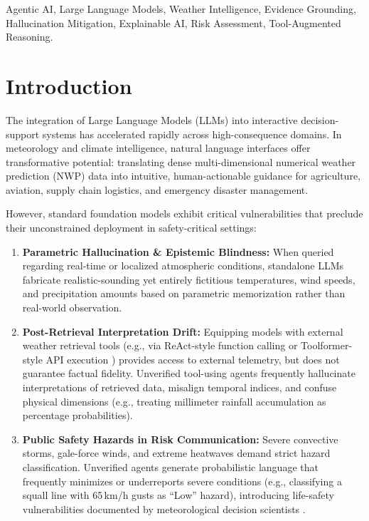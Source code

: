 \documentclass[conference]{IEEEtran}
\begin{document}
\begin{IEEEkeywords}
Agentic AI, Large Language Models, Weather Intelligence, Evidence Grounding, Hallucination Mitigation, Explainable AI, Risk Assessment, Tool-Augmented Reasoning.
\end{IEEEkeywords}

\section{Introduction}

The integration of Large Language Models (LLMs) into interactive decision-support systems has accelerated rapidly across high-consequence domains. In meteorology and climate intelligence, natural language interfaces offer transformative potential: translating dense multi-dimensional numerical weather prediction (NWP) data into intuitive, human-actionable guidance for agriculture, aviation, supply chain logistics, and emergency disaster management.

However, standard foundation models exhibit critical vulnerabilities that preclude their unconstrained deployment in safety-critical settings:
\begin{enumerate}
    \item \textbf{Parametric Hallucination \& Epistemic Blindness:} When queried regarding real-time or localized atmospheric conditions, standalone LLMs fabricate realistic-sounding yet entirely fictitious temperatures, wind speeds, and precipitation amounts based on parametric memorization rather than real-world observation.
    \item \textbf{Post-Retrieval Interpretation Drift:} Equipping models with external weather retrieval tools (e.g., via ReAct-style function calling \cite{yao2023react} or Toolformer-style API execution \cite{schick2023toolformer}) provides access to external telemetry, but does not guarantee factual fidelity. Unverified tool-using agents frequently hallucinate interpretations of retrieved data, misalign temporal indices, and confuse physical dimensions (e.g., treating millimeter rainfall accumulation as percentage probabilities).
    \item \textbf{Public Safety Hazards in Risk Communication:} Severe convective storms, gale-force winds, and extreme heatwaves demand strict hazard classification. Unverified agents generate probabilistic language that frequently minimizes or underreports severe conditions (e.g., classifying a squall line with 65\,km/h gusts as ``Low'' hazard), introducing life-safety vulnerabilities documented by meteorological decision scientists \cite{morss2017weather_risk}.
\end{enumerate}
\end{document}

